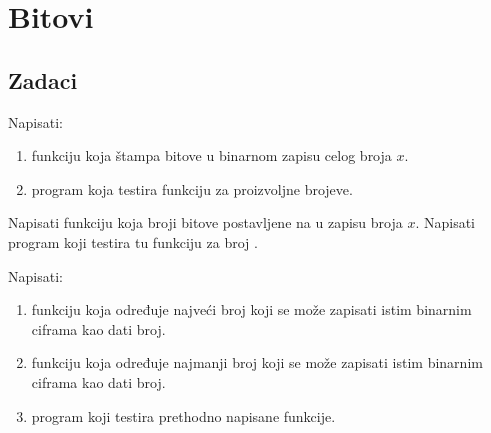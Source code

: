 
\chapter{Bitovi}

\section{Zadaci}



\begin{Exercise}[label=201]
Napisati:
\begin{enumerate}
\item funkciju  koja štampa bitove u binarnom zapisu celog broja $x$.
\item program koja testira funkciju  za proizvoljne brojeve.
\end{enumerate}
\end{Exercise}
\begin{Answer}[ref=201]
\end{Answer}

\begin{Exercise}[label=202]
 Napisati funkciju koja broji bitove postavljene na  u zapisu broja $x$. Napisati program koji testira tu funkciju za broj .
\end{Exercise}
\begin{Answer}[ref=202]
\end{Answer}


\begin{Exercise}[label=203]
Napisati:
\begin{enumerate}
\item funkciju koja određuje najveći broj koji se može zapisati istim binarnim ciframa kao dati broj.
\item funkciju koja određuje najmanji broj koji se može zapisati istim binarnim ciframa kao dati broj.
\item program koji testira prethodno napisane funkcije.
\end{enumerate}
\end{Exercise}
\begin{Answer}[ref=203]
\end{Answer}


